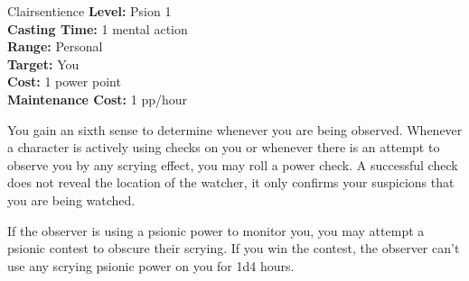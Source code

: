 {Clairsentience}
{
	\textbf{Level:}
	Psion 1\\
	\textbf{Casting Time:}
	1 mental action\\
	\textbf{Range:}
	Personal\\
	\textbf{Target:}
	You\\
	\textbf{Cost:}
	1 power point\\
	\textbf{Maintenance Cost:}
	1 pp/hour\\
}
{
	You gain an sixth sense to determine whenever you are being observed. Whenever a character is actively using  checks on you or whenever there is an attempt to observe you by any scrying effect, you may roll a power check. A successful check does not reveal the location of the watcher, it only confirms your suspicions that you are being watched.

	If the observer is using a psionic power to monitor you, you may attempt a psionic contest to obscure their scrying. If you win the contest, the observer can't use any scrying psionic power on you for 1d4 hours.
}